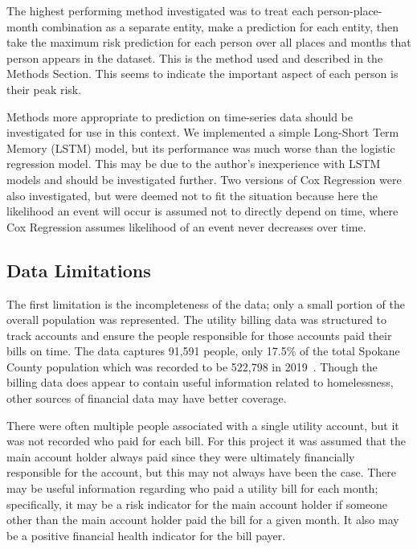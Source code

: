 \documentclass[10pt,letterpaper]{article}
\begin{document}
The highest performing method investigated was to treat each person-place-month combination as a separate entity, make a prediction for each entity, then take the maximum risk prediction for each person over all places and months that person appears in the dataset. This is the method used and described in the Methods Section. This seems to indicate the important aspect of each person is their peak risk. 

Methods more appropriate to prediction on time-series data should be investigated for use in this context. We implemented a simple Long-Short Term Memory (LSTM) model, but its performance was much worse than the logistic regression model. This may be due to the author's inexperience with LSTM models and should be investigated further. Two versions of Cox Regression were also investigated, but were deemed not to fit the situation because here the likelihood an event will occur is assumed not to directly depend on time, where Cox Regression assumes likelihood of an event never decreases over time.

\subsection*{Data Limitations}
The first limitation is the incompleteness of the data; only a small portion of the overall population was represented. The utility billing data was structured to track accounts and ensure the people responsible for those accounts paid their bills on time. The data captures 91,591 people, only 17.5\% of the total Spokane County population which was recorded to be 522,798 in 2019~\cite{SpokanePop}. Though the billing data does appear to contain useful information related to homelessness, other sources of financial data may have better coverage.

There were often multiple people associated with a single utility account, but it was not recorded who paid for each bill. For this project it was assumed that the main account holder always paid since they were ultimately financially responsible for the account, but this may not always have been the case. There may be useful information regarding who paid a utility bill for each month; specifically, it may be a risk indicator for the main account holder if someone other than the main account holder paid the bill for a given month. It also may be a positive financial health indicator for the bill payer.
\end{document}
